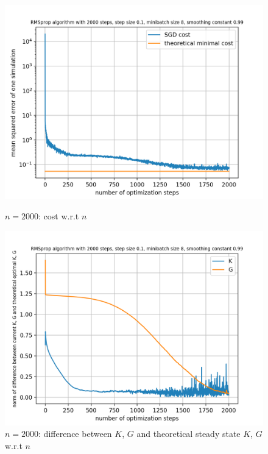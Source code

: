 \documentclass{article}
\begin{document}
\begin{figure}[h!]
	\centering
	\begin{minipage}[t]{.27\paperwidth}
		\centering
		\includegraphics[width=1.0\textwidth]{Figures/sgd_2000.png}
		\caption{$n=2000$: cost w.r.t $n$\label{fig:sgd_2000}}
	\end{minipage}%
	\begin{minipage}[t]{.27\paperwidth}
		\centering
		\includegraphics[width=1.0\textwidth]{Figures/diff_2000.png}
		\caption{$n=2000$: difference between $K$, $G$ and theoretical steady state $K$, $G$ w.r.t $n$\label{fig:diff_2000}}
	\end{minipage}%
	\begin{minipage}[t]{.27\paperwidth}

\end{minipage}
\end{figure}
\end{document}
